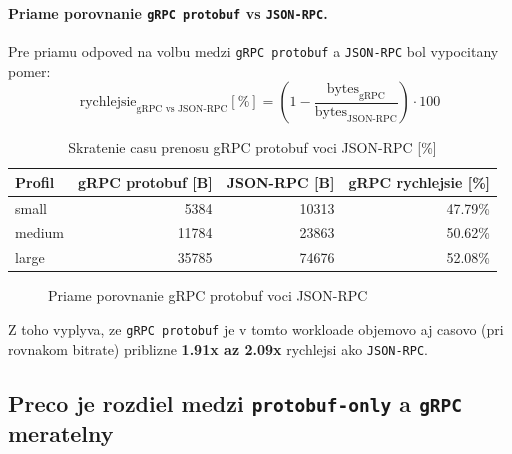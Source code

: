 \documentclass[12pt,a4paper]{report}
\begin{document}
\paragraph{Priame porovnanie \texttt{gRPC protobuf} vs \texttt{JSON-RPC}.}

Pre priamu odpoved na volbu medzi \texttt{gRPC protobuf} a \texttt{JSON-RPC}
bol vypocitany pomer:
\begin{equation}
\text{rychlejsie}_{\text{gRPC vs JSON-RPC}}[\%] =
\left(1-\frac{\text{bytes}_{\text{gRPC}}}{\text{bytes}_{\text{JSON-RPC}}}\right)\cdot100
\end{equation}

\begin{table}[htbp]
\centering
\caption{Skratenie casu prenosu gRPC protobuf voci JSON-RPC [\%]}
\label{tab:grpc-vs-jsonrpc}
\begin{tabular}{|l|r|r|r|}
\hline
Profil & gRPC protobuf [B] & JSON-RPC [B] & gRPC rychlejsie [\%] \\
\hline
small  & 5384  & 10313 & 47.79\% \\
medium & 11784 & 23863 & 50.62\% \\
large  & 35785 & 74676 & 52.08\% \\
\hline
\end{tabular}
\end{table}

\begin{figure}[htbp]
\centering
{}
\caption{Priame porovnanie gRPC protobuf voci JSON-RPC}
\label{fig:grpc-vs-jsonrpc-speedup}
\end{figure}

Z toho vyplyva, ze \texttt{gRPC protobuf} je v tomto workloade
objemovo aj casovo (pri rovnakom bitrate) priblizne \textbf{1.91x az 2.09x}
rychlejsi ako \texttt{JSON-RPC}.

\subsection{Preco je rozdiel medzi \texttt{protobuf-only} a \texttt{gRPC} meratelny}
\end{document}
